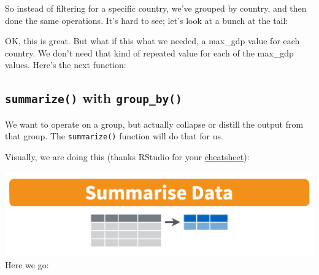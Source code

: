 \documentclass[]{book}
\newenvironment{Shaded}{\begin{snugshade}}{\end{snugshade}}
\newcommand{\KeywordTok}[1]{\textcolor[rgb]{0.13,0.29,0.53}{\textbf{{#1}}}}
\newcommand{\DataTypeTok}[1]{\textcolor[rgb]{0.13,0.29,0.53}{{#1}}}
\newcommand{\DecValTok}[1]{\textcolor[rgb]{0.00,0.00,0.81}{{#1}}}
\newcommand{\StringTok}[1]{\textcolor[rgb]{0.31,0.60,0.02}{{#1}}}
\newcommand{\NormalTok}[1]{{#1}}
\theoremstyle{definition}
\theoremstyle{definition}
\theoremstyle{definition}
\theoremstyle{remark}
\begin{document}
So instead of filtering for a specific country, we've grouped by
country, and then done the same operations. It's hard to see; let's look
at a bunch at the tail:

\begin{Shaded}
\end{Shaded}

OK, this is great. But what if this what we needed, a max\_gdp value for
each country. We don't need that kind of repeated value for each of the
max\_gdp values. Here's the next function:

\subsection{\texorpdfstring{\texttt{summarize()} with
\texttt{group\_by()}}{summarize() with group\_by()}}\label{summarize-with-group_by}

We want to operate on a group, but actually collapse or distill the
output from that group. The \texttt{summarize()} function will do that
for us.

Visually, we are doing this (thanks RStudio for your
\href{http://www.rstudio.com/wp-content/uploads/2015/02/data-wrangling-cheatsheet.pdf}{cheatsheet}):

\includegraphics{img/rstudio-cheatsheet-summarise.png} Here we go:

\begin{Shaded}
\end{Shaded}
\end{document}
